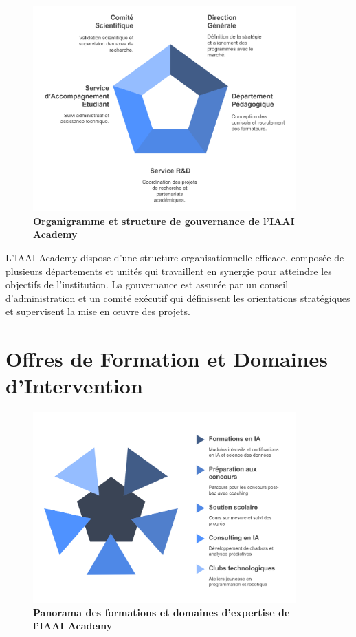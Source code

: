 \begin{figure}[H]
  \centering
  \includegraphics[width=0.9\textwidth]{images/Structure_Organisationnelle.png}
  \caption{\textbf{Organigramme et structure de gouvernance de l'IAAI Academy}}
  \label{fig:structure}
\end{figure}

L'IAAI Academy dispose d'une structure organisationnelle efficace, composée de plusieurs départements et unités qui travaillent en synergie pour atteindre les objectifs de l'institution. La gouvernance est assurée par un conseil d'administration et un comité exécutif qui définissent les orientations stratégiques et supervisent la mise en œuvre des projets.

\section{Offres de Formation et Domaines d'Intervention}

\begin{figure}[H]
  \centering
  \includegraphics[width=0.9\textwidth]{images/Offres_de_Formation.png}
  \caption{\textbf{Panorama des formations et domaines d'expertise de l'IAAI Academy}}
  \label{fig:formations}
\end{figure}

